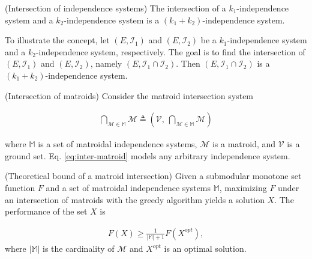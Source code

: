 \begin{theorem} \label{thm:intersection-k-systems} (Intersection of independence systems) \cite{mestre2015intersection}
The intersection of a $k_1$-independence system and a $k_2$-independence system is a $(k_1 + k_2)$-independence system. \\
\end{theorem}

To illustrate the concept, let $(E, \mathcal{I}_1)$ and $(E, \mathcal{I}_2)$ be a $k_1$-independence system and a $k_2$-independence system, respectively.
The goal is to find the intersection of $(E, \mathcal{I}_1)$ and $(E, \mathcal{I}_2)$, namely $(E, \mathcal{I}_1 \cap \mathcal{I}_2)$. Then $(E, \mathcal{I}_1 \cap \mathcal{I}_2)$ is a $(k_1 + k_2)$-independence system. \\

\begin{theorem} \label{thm:intersection-matroid} (Intersection of matroids) \cite{nemhauser1978analysis}
Consider the matroid intersection system

\begin{align} \label{eq:inter-matroid}
    \bigcap_{\mathcal{M}\in \mathit{\mathbb{M}}} \mathcal{M} \triangleq\left ( \mathcal{V},\ \bigcap_{\mathcal{M}\in \mathit{\mathbb{M}}} \mathcal{M} \right )
\end{align}

where $\mathit{\mathbb{M}}$ is a set of matroidal independence systems, $\mathcal{M}$ is a matroid, and $\mathcal{V}$ is a ground set. Eq. \eqref{eq:inter-matroid} models any arbitrary independence system. \\
\end{theorem}

\begin{theorem} \label{thm:intersection-matroid-bound} (Theoretical bound of a matroid intersection) \cite{fisher1978analysis}
Given a submodular monotone set function $F$ and a set of matroidal independence systems $\mathit{\mathbb{M}}$, maximizing $F$ under an intersection of matroids with the greedy algorithm yields a solution $X$. The performance of the set $X$ is

\begin{align*} \label{eq:inter-matroid}
    F(X) \geq \frac{1}{|\mathit{\mathbb{M}}|+1} F(X^{opt}),
\end{align*}
where $|\mathit{\mathbb{M}}|$ is the cardinality of $\mathcal{M}$ and $X^{opt}$ is an optimal solution. \\
\end{theorem}

